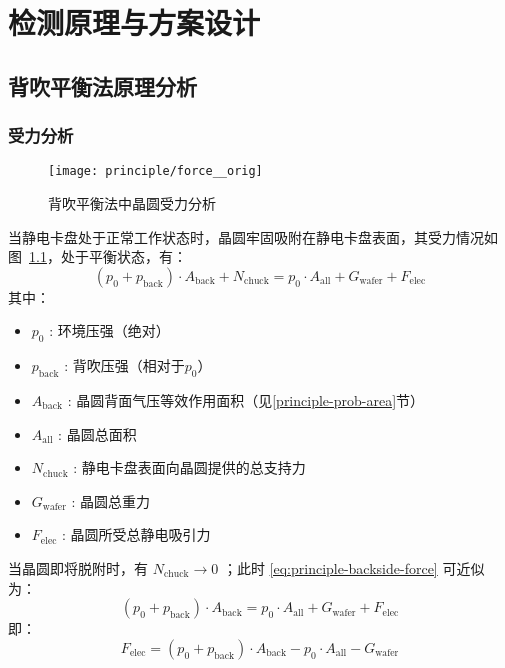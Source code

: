 \cleardoublepage
\chapter{检测原理与方案设计}\label{ch:principle}



\section{背吹平衡法原理分析}\label{sec:principle-backside}


\subsection{受力分析}\label{sec:principle-backside-force}

\begin{figure}[tbh]
\centering
\texttt{[image: principle/force\_\_orig]}
\caption{背吹平衡法中晶圆受力分析}
\label{fig:principle-backside-force}
\end{figure}

当静电卡盘处于正常工作状态时，晶圆牢固吸附在静电卡盘表面，其受力情况如图~\ref{fig:principle-backside-force}，处于平衡状态，有：
\begin{equation}
\label{eq:principle-backside-force}
(p_{0} + p_{\mathrm{back}}) \cdot A_{\mathrm{back}} + N_{\mathrm{chuck}} = p_0 \cdot A_{\mathrm{all}} + G_{\mathrm{wafer}} + F_{\mathrm{elec}}
\end{equation}
其中：
\begin{itemize}
  \item $p_{0}$ : 环境压强（绝对）
  \item $p_{\mathrm{back}}$  : 背吹压强（相对于$p_{0}$）
  \item $A_{\mathrm{back}}$  : 晶圆背面气压等效作用面积（见\ref{principle-prob-area}节）
  \item $A_{\mathrm{all}}$   : 晶圆总面积
  \item $N_{\mathrm{chuck}}$ : 静电卡盘表面向晶圆提供的总支持力
  \item $G_{\mathrm{wafer}}$ : 晶圆总重力
  \item $F_{\mathrm{elec}}$  : 晶圆所受总静电吸引力
\end{itemize}
当晶圆即将脱附时，有 $N_{\mathrm{chuck}} \to 0$ ；此时 \eqref{eq:principle-backside-force} 可近似为：
\[
(p_{0} + p_{\mathrm{back}}) \cdot A_{\mathrm{back}} = p_0 \cdot A_{\mathrm{all}} + G_{\mathrm{wafer}} + F_{\mathrm{elec}}
\]
即：
\begin{equation}
\label{eq:principle-backside-force-derived}
F_{\mathrm{elec}} = (p_{0} + p_{\mathrm{back}}) \cdot A_{\mathrm{back}} - p_0 \cdot A_{\mathrm{all}} - G_{\mathrm{wafer}}
\end{equation}

